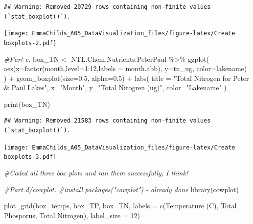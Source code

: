 \documentclass[
]{article}
\newenvironment{Shaded}{\begin{snugshade}}{\end{snugshade}}
\newcommand{\AttributeTok}[1]{\textcolor[rgb]{0.77,0.63,0.00}{#1}}
\newcommand{\CommentTok}[1]{\textcolor[rgb]{0.56,0.35,0.01}{\textit{#1}}}
\newcommand{\DecValTok}[1]{\textcolor[rgb]{0.00,0.00,0.81}{#1}}
\newcommand{\FloatTok}[1]{\textcolor[rgb]{0.00,0.00,0.81}{#1}}
\newcommand{\FunctionTok}[1]{\textcolor[rgb]{0.00,0.00,0.00}{#1}}
\newcommand{\NormalTok}[1]{#1}
\newcommand{\OtherTok}[1]{\textcolor[rgb]{0.56,0.35,0.01}{#1}}
\newcommand{\SpecialCharTok}[1]{\textcolor[rgb]{0.00,0.00,0.00}{#1}}
\newcommand{\StringTok}[1]{\textcolor[rgb]{0.31,0.60,0.02}{#1}}
\begin{document}
\begin{verbatim}
## Warning: Removed 20729 rows containing non-finite values (`stat_boxplot()`).
\end{verbatim}

\texttt{[image: EmmaChilds\_A05\_DataVisualization\_files/figure-latex/Create boxplots-2.pdf]}

\begin{Shaded}
\begin{Highlighting}[]
\CommentTok{\#Part c.}
\NormalTok{box\_TN }\OtherTok{\textless{}{-}}\NormalTok{ NTL.Chem.Nutrients.PeterPaul }\SpecialCharTok{\%\textgreater{}\%}
  \FunctionTok{ggplot}\NormalTok{(}
    \FunctionTok{aes}\NormalTok{(}\AttributeTok{x=}\FunctionTok{factor}\NormalTok{(month,}\AttributeTok{level=}\DecValTok{1}\SpecialCharTok{:}\DecValTok{12}\NormalTok{,}\AttributeTok{labels =}\NormalTok{ month.abb),}
      \AttributeTok{y=}\NormalTok{tn\_ug,}
      \AttributeTok{color=}\NormalTok{lakename)}
\NormalTok{  ) }\SpecialCharTok{+} 
  \FunctionTok{geom\_boxplot}\NormalTok{(}\AttributeTok{size=}\FloatTok{0.5}\NormalTok{, }\AttributeTok{alpha=}\FloatTok{0.5}\NormalTok{) }\SpecialCharTok{+}
    \FunctionTok{labs}\NormalTok{(}
      \AttributeTok{title =} \StringTok{"Total Nitrogen for Peter \& Paul Lakes"}\NormalTok{,}
      \AttributeTok{x=}\StringTok{"Month"}\NormalTok{,}
      \AttributeTok{y=}\StringTok{"Total Nitogren (ug)"}\NormalTok{, }
      \AttributeTok{color=}\StringTok{"Lakename"}
\NormalTok{    ) }

\FunctionTok{print}\NormalTok{(box\_TN)}
\end{Highlighting}
\end{Shaded}

\begin{verbatim}
## Warning: Removed 21583 rows containing non-finite values (`stat_boxplot()`).
\end{verbatim}

\texttt{[image: EmmaChilds\_A05\_DataVisualization\_files/figure-latex/Create boxplots-3.pdf]}

\begin{Shaded}
\begin{Highlighting}[]
\CommentTok{\#Coded all three box plots and ran them successfully, I think!}

\CommentTok{\#Part d/cowplot.}
\CommentTok{\#install.packages("cowplot") {-} already done}
\FunctionTok{library}\NormalTok{(cowplot)}

\FunctionTok{plot\_grid}\NormalTok{(box\_temps, box\_TP, box\_TN, }\AttributeTok{labels =} \FunctionTok{c}\NormalTok{(}\StringTok{\textquotesingle{}Temperature (C)\textquotesingle{}}\NormalTok{, }\StringTok{\textquotesingle{}Total Phosporus\textquotesingle{}}\NormalTok{, }\StringTok{\textquotesingle{}Total Nitrogen\textquotesingle{}}\NormalTok{), }\AttributeTok{label\_size =} \DecValTok{12}\NormalTok{)}
\end{Highlighting}
\end{Shaded}
\end{document}
